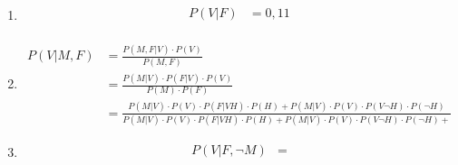 \documentclass[a4paper,10pt,fleqn]{article}
\begin{document}
\begin{enumerate}[1.]
    \item
        \begin{align*}
            P(V| F) & = 0,11 \\
        \end{align*}


    \item
        \begin{align*}
            P(V |M, F)
                & = \frac{P(M,F|V)\cdot P(V)}{P(M,F)} \\
                & = \frac{P(M|V)\cdot P(F|V)\cdot P(V)}{P(M)\cdot P(F)} \\
                & = \frac{P(M|V)\cdot P(V)\cdot P(F|VH)\cdot P(H) + P(M|V)\cdot P(V)\cdot P(V\lnot H)\cdot P(\lnot H)}{P(M|V)\cdot P(V)\cdot P(F|VH)\cdot P(H) + P(M|V)\cdot P(V)\cdot P(V\lnot H)\cdot P(\lnot H) + }
        \end{align*}

    \item
        \begin{align*}
            P(V |F, \neg M) & = \\
        \end{align*}


\end{enumerate}
\end{document}
